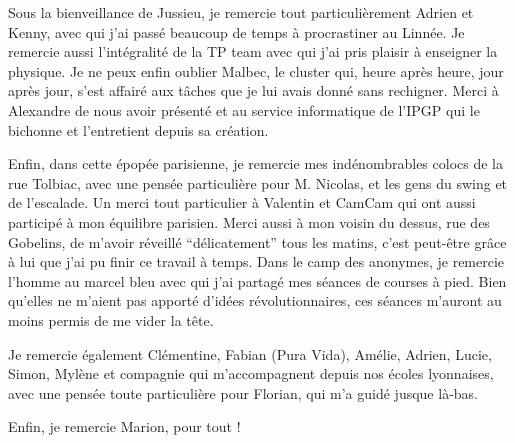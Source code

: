 Sous la  bienveillance de  Jussieu, je remercie  tout particulièrement
Adrien et Kenny, avec qui j’ai  passé beaucoup de temps à procrastiner
au Linnée.   Je remercie aussi  l'intégralité de  la TP team  avec qui
j'ai pris plaisir  à enseigner la physique.  Je ne  peux enfin oublier
Malbec,  le cluster  qui, heure  après heure,  jour après  jour, s’est
affairé aux  tâches que je  lui avais  donné sans rechigner.   Merci à
Alexandre de nous avoir présenté  et au service informatique de l’IPGP
qui le bichonne et l’entretient depuis sa création.

Enfin, dans  cette épopée  parisienne, je remercie  mes indénombrables
colocs  de  la rue  Tolbiac,  avec  une  pensée particulière  pour  M.
Nicolas,  et les  gens  du  swing et  de  l’escalade.   Un merci  tout
particulier  à  Valentin et  CamCam  qui  ont  aussi participé  à  mon
équilibre  parisien. Merci  aussi  à  mon voisin  du  dessus, rue  des
Gobelins, de m’avoir réveillé  ``délicatement'' tous les matins, c’est
peut-être grâce à  lui que j’ai pu  finir ce travail à  temps. Dans le
camp des  anonymes, je remercie l’homme  au marcel bleu avec  qui j’ai
partagé mes  séances de courses à  pied. Bien qu’elles ne  m’aient pas
apporté d’idées révolutionnaires, ces séances m’auront au moins permis
de me vider la tête.

Je remercie également Clémentine,  Fabian (Pura Vida), Amélie, Adrien,
Lucie, Simon, Mylène et compagnie qui m’accompagnent depuis nos écoles
lyonnaises, avec une  pensée toute particulière pour  Florian, qui m’a
guidé jusque là-bas.

Enfin, je remercie Marion, pour tout !











\vspace{2cm}

